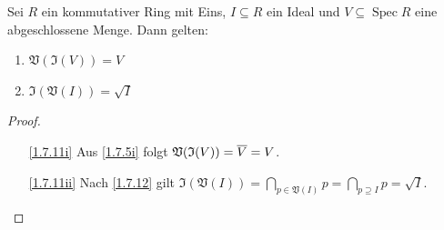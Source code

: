 \documentclass[a4paper,12pt]{scrbook}
\theoremstyle{keinenummern} %
\theoremstyle{mitnummern}
\theoremstyle{unserbeweis}
\newtheorem{proof}{Beweis}
\def\V{\mathfrak{V}}
\def\I{\mathfrak{I}}
\newcommand{\Spec}{\operatorname{Spec}}
\def\Bar#1{\ensuremath\overline{#1}}
\begin{document}
\begin{prop}\label{1.7.11}
  Sei $R$ ein kommutativer Ring mit Eins, $I\subseteq R$ ein Ideal und $V\subseteq\Spec R$ eine abgeschlossene Menge. Dann
  gelten:
  \begin{enumerate}
  \item{} $\V(\I(V))=V$
  \item{} $\I(\V(I))=\sqrt{I}$
  \end{enumerate}
\end{prop}
\begin{proof}
  \begin{enumerate}
  \item[\ref{1.7.11i}] Aus \cref{1.7.5i} folgt $\V(\I(V))=\Bar{V}=V$.
  \item[\ref{1.7.11ii}] Nach \cref{1.7.12} gilt $\displaystyle\I(\V(I))=\bigcap_{p\in\V(I)}p=\bigcap_{p\supseteq I}p=\sqrt{I}$.
  \end{enumerate}
\end{proof}
\end{document}

